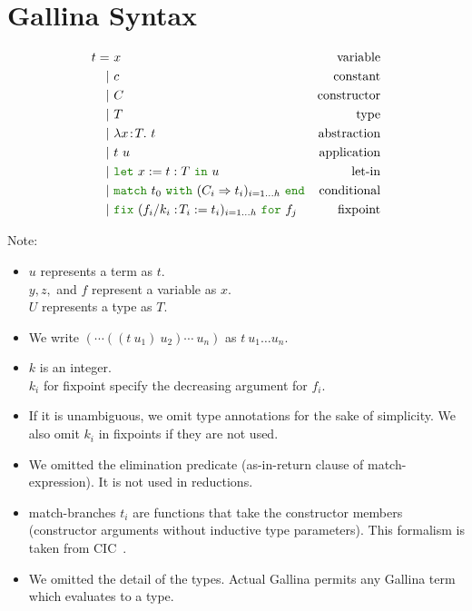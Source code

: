 \documentclass[a4paper,fleqn]{article}
\def\gallina{\textrm{Gallina}}
\newcommand{\kwlet}{\mbox{\color{mygreen}\ttfamily let}}
\newcommand{\kwin}{\mbox{\color{mygreen}\ttfamily in}}
\newcommand{\kwmatch}{\mbox{\color{mygreen}\ttfamily match}}
\newcommand{\kwas}{\mbox{\color{mygreen}\ttfamily as}}
\newcommand{\kwreturn}{\mbox{\color{mygreen}\ttfamily return}}
\newcommand{\kwwith}{\mbox{\color{mygreen}\ttfamily with}}
\newcommand{\kwend}{\mbox{\color{mygreen}\ttfamily end}}
\newcommand{\kwfix}{\mbox{\color{mygreen}\ttfamily fix}}
\newcommand{\kwfor}{\mbox{\color{mygreen}\ttfamily for}}
\newcommand{\lamT}[3]{\lambda #1\!:\!#2.~#3}
\newcommand{\letin}[3]{\kwlet~#1:=#2~\kwin~#3}
\newcommand{\match}[4]{\kwmatch~#1~\kwwith~(#2 \Rightarrow #3)_{#4}~\kwend}
\newcommand{\fixT}[5]{\kwfix~(#1:\!#2 := #3)_{#4}~\kwfor~#5}
\begin{document}
\section{\gallina{} Syntax}\label{sec:gallina-syntax}

\begin{align*}
  t =&\ x & \text{variable} \\
    |&\ c & \text{constant} \\
    |&\ C & \text{constructor} \\
    |&\ T & \text{type} \\
    |&\ \lamT{x}{T}{t}        & \text{abstraction} \\
    |&\ t~u                   & \text{application} \\
    |&\ \letin{x}{t:T}{u}     & \text{let-in} \\
    |&\ \match{t_0}{C_i}{t_i}{i=1\dots h} & \text{conditional} \\
    |&\ \fixT{f_i/k_i}{T_i}{t_i}{i=1\dots h}{f_j} & \text{fixpoint}
\end{align*}
\raggedright
{\small Note:
\begin{itemize}
  \item $u$ represents a term as $t$. \\ $y, z,$ and $f$ represent a variable as $x$. \\ $U$ represents a type as $T$.
  \item We write $(\cdots((t~u_1)~u_2)\cdots~u_n)$ as $t~u_1\dots u_n$.
  \item $k$ is an integer. \\ $k_i$ for fixpoint specify the decreasing argument for $f_i$.
  \item If it is unambiguous, we omit type annotations for the sake of simplicity.  We also omit $k_i$ in fixpoints if they are not used.
  \item We omitted the elimination predicate (\kwas-\kwin-\kwreturn{} clause of \kwmatch-expression).  It is not used in reductions.
  \item \kwmatch-branches $t_i$ are functions that take the constructor members (constructor arguments without inductive type parameters).
    This formalism is taken from CIC~\cite{coqrefman8.12.0}.
  \item We omitted the detail of the types.  Actual \gallina{} permits any \gallina{} term which evaluates to a type.
\end{itemize}}
\end{document}
